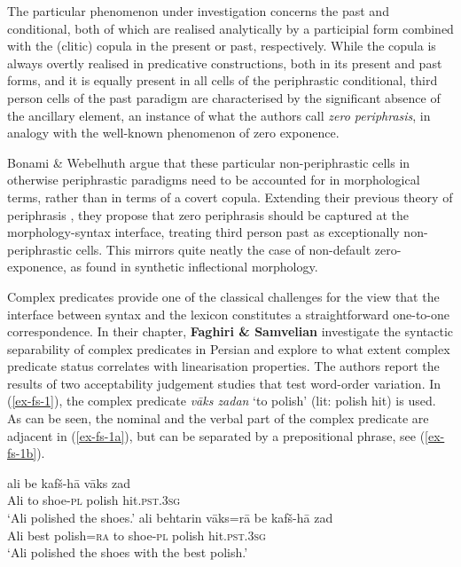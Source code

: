 \documentclass[output=paper]{langscibook}
\begin{document}
The particular phenomenon under investigation concerns the past and
conditional, both of which are realised analytically by a participial
form combined with the (clitic) copula in the present or past,
respectively. While the copula is always overtly realised in
predicative constructions, both in its present and past forms, and it
is equally present in all cells of the periphrastic conditional, third
person cells of the past paradigm are characterised by the significant
absence of the ancillary element, an instance of what the authors call
\textit{zero periphrasis}, in analogy with the well-known phenomenon
of zero exponence. 

Bonami \& Webelhuth argue that these particular non-periphrastic
cells in otherwise periphrastic paradigms need to be accounted for in
morphological terms, rather than in terms of a covert copula.
Extending their previous theory of periphrasis
\citep{Bonami14d,Bonami16b,Bonami13}, they propose that zero
periphrasis should be captured at the morphology-syntax interface,
treating third person past as exceptionally non-periphrastic
cells. This mirrors quite neatly the case of non-default
zero-exponence, as found in synthetic inflectional morphology. 

Complex predicates provide one of the classical challenges for the
view that the interface between syntax and the lexicon constitutes a
straightforward one-to-one correspondence. In their chapter,
\textbf{Faghiri \& Samvelian} investigate the syntactic separability
of complex predicates in Persian and explore to what extent complex
predicate status correlates with linearisation properties.  The
authors report the results of two acceptability judgement studies that test
word-order variation. In (\ref{ex-fs-1}), the complex predicate
\textit{v\={a}ks zadan} `to polish' (lit: polish hit) is used.
As can be seen, the nominal and the verbal part of the complex
predicate are adjacent in (\ref{ex-fs-1a}), but can be separated by a
prepositional phrase, see (\ref{ex-fs-1b}).

\ea \label{ex-fs-1}
\begin{xlist}
\ex 
\gll ali be kaf\v{s}-h\={a} v\={a}ks zad\\
Ali to shoe-\textsc{pl} polish hit.\textsc{pst.3sg}\\
\glt `Ali polished the shoes.'\label{ex-fs-1a}
\ex
\gll ali behtarin v\={a}ks=r\={a} be kaf\v{s}-h\={a}  zad\\
Ali best polish=\textsc{ra} to shoe-\textsc{pl} polish hit.\textsc{pst.3sg}\\
\glt `Ali polished the shoes with the best polish.'
\label{ex-fs-1b}
\end{xlist}
\z 
\end{document}
